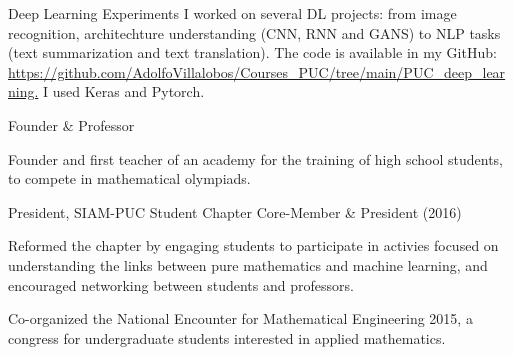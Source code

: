 
\begin{cventries}
  \cventry
  {Deep Learning Experiments}
  {}
  {}
  {}{
   I worked on several DL projects: from image recognition, architechture understanding (CNN, RNN and GANS)
   to NLP tasks (text summarization and text translation). The code is available in my GitHub: \url{https://github.com/AdolfoVillalobos/Courses_PUC/tree/main/PUC_deep_learning.}
   I used Keras and Pytorch. 
  }
\end{cventries}

\begin{cventries}
  {}
  {}
  {Founder \& Professor}
  {\begin{cvitems}
    \item {Founder and first teacher of an academy for the training of high school students, to compete in mathematical olympiads.}
  \end{cvitems}
}
  \cventry
  {President, SIAM-PUC Student Chapter}
  {}
  {}
  {Core-Member \& President (2016)}
  {
    \begin{cvitems}
      \item {Reformed the chapter by engaging students to participate in activies focused 
        on understanding the links between pure mathematics and machine learning,
        and encouraged networking between students and professors.}
      \item {Co-organized the National Encounter for Mathematical Engineering 2015, a congress for undergraduate students interested in applied mathematics.}
    \end{cvitems}
    }
\end{cventries}

 

